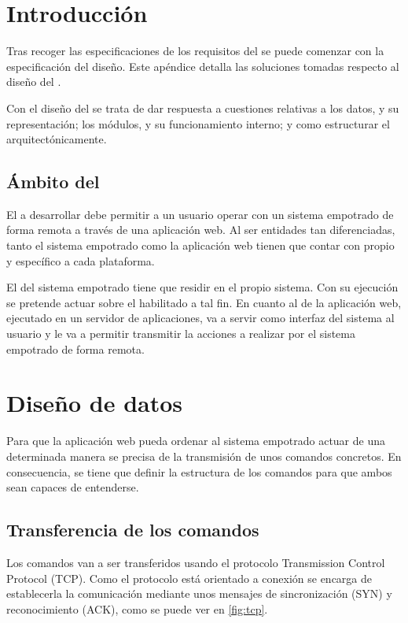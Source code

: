  \label{ch:design}

\section{Introducción} \label{sec:design-intro}
Tras recoger las especificaciones de los requisitos del \sw{} se 
puede comenzar con la especificación del diseño. Este apéndice detalla
las soluciones tomadas respecto al diseño del \sw{}.

Con el diseño del \sw{} se trata de dar respuesta a cuestiones relativas a los
datos, y su representación; los módulos, y su funcionamiento interno; y
como estructurar el \sw{} arquitectónicamente.

\subsection{Ámbito del \sw{}} \label{sec:design-ambito}
El \sw{} a desarrollar debe permitir a un usuario operar con un
sistema empotrado de forma remota a través de una aplicación web. Al ser
entidades tan diferenciadas, tanto el sistema empotrado como la aplicación web
tienen que contar con \sw{} propio y específico a cada plataforma.

El \sw{} del sistema empotrado tiene que residir en el propio sistema. Con su
ejecución se pretende actuar sobre el \hw{} habilitado a tal fin. En cuanto al
\sw{} de la aplicación web, ejecutado en un servidor de aplicaciones, va a
servir como interfaz del sistema al usuario y le va a permitir transmitir
la acciones a realizar por el sistema empotrado de forma remota.

\section{Diseño de datos} \label{sec:design-datos}
Para que la aplicación web pueda ordenar al sistema empotrado actuar de una
determinada manera se precisa de la transmisión de unos comandos concretos. En
consecuencia, se tiene que definir la estructura de los comandos para que ambos
\sw{} sean capaces de entenderse.

\subsection{Transferencia de los comandos} \label{sec:design-transferencia}
Los comandos van a ser transferidos usando el protocolo Transmission Control
Protocol (TCP). Como el protocolo está orientado a conexión se encarga de
establecerla la comunicación mediante unos mensajes de sincronización (SYN) y
reconocimiento (ACK), como se puede ver en \ref{fig:tcp}.

